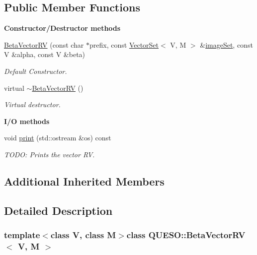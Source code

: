 \subsection*{Public Member Functions}
\begin{Indent}{\bf Constructor/\-Destructor methods}\par
\begin{DoxyCompactItemize}
\item 
\hyperlink{class_q_u_e_s_o_1_1_beta_vector_r_v_a090eae9c454f4f68d536c2237e4bff03}{Beta\-Vector\-R\-V} (const char $\ast$prefix, const \hyperlink{class_q_u_e_s_o_1_1_vector_set}{Vector\-Set}$<$ V, M $>$ \&\hyperlink{class_q_u_e_s_o_1_1_base_vector_r_v_aa4dd2f036228eac1f945bacc7147a922}{image\-Set}, const V \&alpha, const V \&beta)
\begin{DoxyCompactList}\small\item\em Default Constructor. \end{DoxyCompactList}\item 
virtual \hyperlink{class_q_u_e_s_o_1_1_beta_vector_r_v_a24d791770f3518157c00a36a3c421649}{$\sim$\-Beta\-Vector\-R\-V} ()
\begin{DoxyCompactList}\small\item\em Virtual destructor. \end{DoxyCompactList}\end{DoxyCompactItemize}
\end{Indent}
\begin{Indent}{\bf I/\-O methods}\par
\begin{DoxyCompactItemize}
\item 
void \hyperlink{class_q_u_e_s_o_1_1_beta_vector_r_v_ae54ad1998b22aed2f5c8061cd1ad56e5}{print} (std\-::ostream \&os) const 
\begin{DoxyCompactList}\small\item\em T\-O\-D\-O\-: Prints the vector R\-V. \end{DoxyCompactList}\end{DoxyCompactItemize}
\end{Indent}
\subsection*{Additional Inherited Members}


\subsection{Detailed Description}
\subsubsection*{template$<$class V, class M$>$class Q\-U\-E\-S\-O\-::\-Beta\-Vector\-R\-V$<$ V, M $>$}

